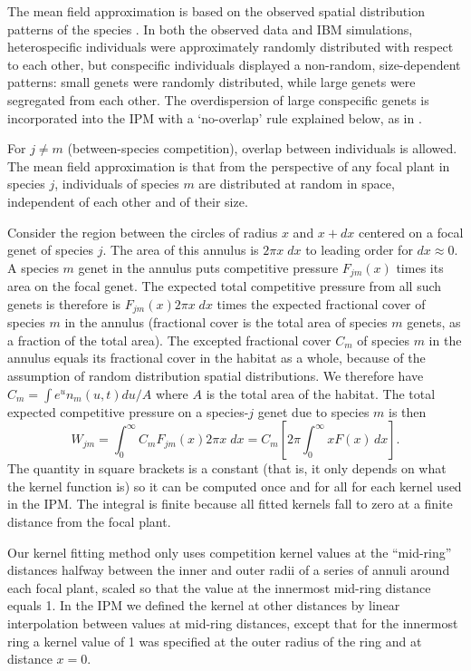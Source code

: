 \documentclass[11pt]{article}
\begin{document}
The mean field approximation is based on the observed spatial distribution patterns of the species \citep{adler_coexistence_2010}. 
In both the observed data and IBM simulations, heterospecific individuals were approximately randomly distributed with respect to each other, 
but conspecific individuals displayed a non-random, size-dependent patterns: small genets were randomly distributed, while large genets 
were segregated from each other. The overdispersion of large conspecific genets is incorporated into the IPM 
with a `no-overlap' rule explained below, as in \citep{adler_coexistence_2010}.

For $j \ne m$ (between-species competition), overlap between individuals is allowed. The mean field approximation is 
that from the perspective of any focal plant in species $j$, individuals of species $m$ are distributed at random in space, 
independent of each other and of their size.

Consider the region between the circles of radius $x$ and $x+dx$ centered on a focal genet of species $j$. The area of this annulus
is $2 \pi x \; dx$  to leading order for $dx \approx 0$. A species $m$ genet 
in the annulus puts competitive pressure $F_{jm}(x)$ times its area on
the focal genet. The expected total competitive pressure from all such genets 
is therefore is $F_{jm}(x) 2 \pi x \; dx$ times the expected fractional cover of species $m$ in the annulus 
(fractional cover is the total area of species $m$ genets, as a fraction of the total area). The excepted fractional cover $C_m$ of species $m$
in the annulus equals its fractional cover in the habitat as a whole, because of the assumption of random distribution
spatial distributions. We therefore have $C_m  = \int e^u n_m(u,t) du/A$ where $A$ is the total area of the habitat. 
The total expected competitive pressure on a species-$j$ genet due to species $m$ is then 
\begin{equation}
W_{jm} = \int_0^\infty{C_m F_{jm}(x) 2 \pi x \; dx}  = C_m \left [2 \pi \int_0^{\infty} x F(x) \, dx \right ].
\label{eqn:wbarm}
\end{equation} 
The quantity in square brackets is a constant (that is, it only depends on what the kernel function
is) so it can be computed once and for all for each kernel used in the IPM. The integral is finite because
all fitted kernels fall to zero at a finite distance from the focal plant. 

Our kernel fitting method only uses competition kernel values at the ``mid-ring'' distances
halfway between the inner and outer radii of a series of annuli around each focal
plant, scaled so that the value at the innermost mid-ring distance equals 1. 
In the IPM we defined the kernel at other distances by linear interpolation between values at 
mid-ring distances, except that for the innermost ring a kernel value of 1 was specified at the
outer radius of the ring and at distance $x=0$. 
\end{document}
